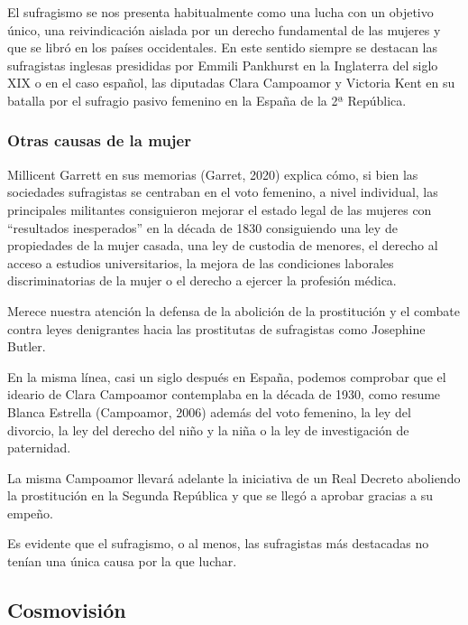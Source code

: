 \documentclass[
]{article}
\begin{document}
El sufragismo se nos presenta habitualmente como una lucha con un
objetivo único, una reivindicación aislada por un derecho fundamental de
las mujeres y que se libró en los países occidentales. En este sentido
siempre se destacan las sufragistas inglesas presididas por Emmili
Pankhurst en la Inglaterra del siglo XIX o en el caso español, las
diputadas Clara Campoamor y Victoria Kent en su batalla por el sufragio
pasivo femenino en la España de la 2ª República.

\hypertarget{otras-causas-de-la-mujer}{%
\subsubsection{Otras causas de la
mujer}\label{otras-causas-de-la-mujer}}

Millicent Garrett en sus memorias (Garret, 2020) explica cómo, si bien
las sociedades sufragistas se centraban en el voto femenino, a nivel
individual, las principales militantes consiguieron mejorar el estado
legal de las mujeres con ``resultados inesperados'' en la década de 1830
consiguiendo una ley de propiedades de la mujer casada, una ley de
custodia de menores, el derecho al acceso a estudios universitarios, la
mejora de las condiciones laborales discriminatorias de la mujer o el
derecho a ejercer la profesión médica.

Merece nuestra atención la defensa de la abolición de la prostitución y
el combate contra leyes denigrantes hacia las prostitutas de sufragistas
como Josephine Butler.

En la misma línea, casi un siglo después en España, podemos comprobar
que el ideario de Clara Campoamor contemplaba en la década de 1930, como
resume Blanca Estrella (Campoamor, 2006) además del voto femenino, la
ley del divorcio, la ley del derecho del niño y la niña o la ley de
investigación de paternidad.

La misma Campoamor llevará adelante la iniciativa de un Real Decreto
aboliendo la prostitución en la Segunda República y que se llegó a
aprobar gracias a su empeño.

Es evidente que el sufragismo, o al menos, las sufragistas más
destacadas no tenían una única causa por la que luchar.

\hypertarget{cosmovisiuxf3n}{%
\subsection{Cosmovisión}\label{cosmovisiuxf3n}}
\end{document}
